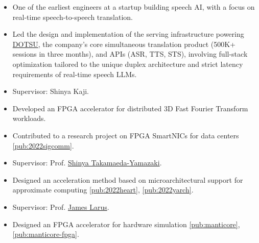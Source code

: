\documentclass[10pt]{extarticle}
\begin{document}
\begin{itemize}
    \item One of the earliest engineers at a startup building speech AI, with a focus on real-time speech-to-speech translation.
    \item Led the design and implementation of the serving infrastructure powering \href{https://apps.apple.com/app/id6740851285}{DOTSU}, the company's core simultaneous translation product (500K+ sessions in three months), and APIs (ASR, TTS, STS), involving full-stack optimization tailored to the unique duplex architecture and strict latency requirements of real-time speech LLMs.
\end{itemize}

\begin{itemize}
    \item Supervisor: Shinya Kaji.
    \item Developed an FPGA accelerator for distributed 3D Fast Fourier Transform workloads.
    \item Contributed to a research project on FPGA SmartNICs for data centers \ref{pub:2022sigcomm}.
\end{itemize}

\begin{itemize}
    \item Supervisor: Prof. \href{https://sites.google.com/site/shinyaty/home}{Shinya Takamaeda-Yamazaki}.
    \item Designed an acceleration method based on microarchitectural support for approximate computing \ref{pub:2022heart}, \ref{pub:2022yarch}.
\end{itemize}

\begin{itemize}
    \item Supervisor: Prof. \href{https://people.epfl.ch/james.larus}{James Larus}.
    \item Designed an FPGA accelerator for hardware simulation \ref{pub:manticore}, \ref{pub:manticore-fpga}.
\end{itemize}
\end{document}
